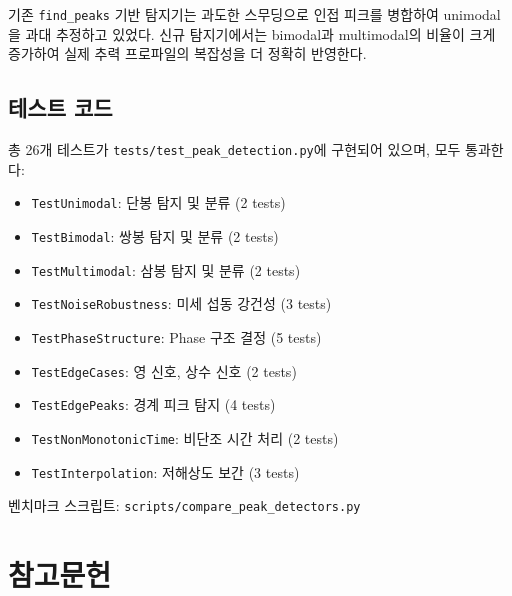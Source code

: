 \documentclass[11pt]{article}
\begin{document}
기존 \texttt{find\_peaks} 기반 탐지기는 과도한 스무딩으로 인접 피크를 병합하여 unimodal을 과대 추정하고 있었다.
신규 탐지기에서는 bimodal과 multimodal의 비율이 크게 증가하여 실제 추력 프로파일의 복잡성을 더 정확히 반영한다.

\subsection{테스트 코드}

총 26개 테스트가 \texttt{tests/test\_peak\_detection.py}에 구현되어 있으며, 모두 통과한다:

\begin{itemize}[nosep]
\item \texttt{TestUnimodal}: 단봉 탐지 및 분류 (2 tests)
\item \texttt{TestBimodal}: 쌍봉 탐지 및 분류 (2 tests)
\item \texttt{TestMultimodal}: 삼봉 탐지 및 분류 (2 tests)
\item \texttt{TestNoiseRobustness}: 미세 섭동 강건성 (3 tests)
\item \texttt{TestPhaseStructure}: Phase 구조 결정 (5 tests)
\item \texttt{TestEdgeCases}: 영 신호, 상수 신호 (2 tests)
\item \texttt{TestEdgePeaks}: 경계 피크 탐지 (4 tests)
\item \texttt{TestNonMonotonicTime}: 비단조 시간 처리 (2 tests)
\item \texttt{TestInterpolation}: 저해상도 보간 (3 tests)
\end{itemize}

벤치마크 스크립트: \texttt{scripts/compare\_peak\_detectors.py}


\section{참고문헌}



\end{document}
